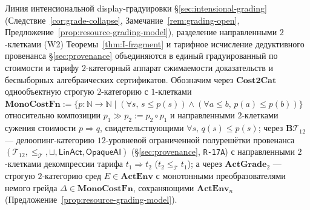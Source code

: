 \documentclass[11pt]{article}
\theoremstyle{plain}
\theoremstyle{definition}
\begin{document}
Линия интенсиональной display-градуировки \S\ref{sec:intensional-grading} (Следствие~\ref{cor:grade-collapse}, Замечание~\ref{rem:grading-open}, Предложение~\ref{prop:resource-grading-model}), разделение направленными $2$-клетками \textup{(W2)} Теоремы~\ref{thm:I-fragment} и тарифное исчисление дедуктивного провенанса \S\ref{sec:provenance} объединяются в единый градуированный по стоимости и тарифу $2$-категорный аппарат сжимаемости доказательств и бесвыборных алгебраических сертификатов. Обозначим через $\mathbf{Cost2Cat}$ однообъектную строгую $2$-категорию с $1$-клетками $\mathbf{MonoCostFn} := \{p : \mathbb{N} \to \mathbb{N} \mid (\forall s,\, s \le p(s)) \wedge (\forall a \le b,\, p(a) \le p(b))\}$ относительно композиции $p_1 \gg p_2 := p_2 \circ p_1$ и направленными $2$-клетками сужения стоимости $p \Rightarrow q$, свидетельствующими $\forall s,\, q(s) \le p(s)$; через $\mathbf{B}\mathcal{T}_{12}$ --- делоопинг-категорию $12$-уровневой ограниченной полурешётки провенанса $(\mathcal{T}_{12}, \le_{\mathcal{T}}, \sqcup, \mathsf{LinAct}, \mathsf{OpaqueAI})$ (\S\ref{sec:provenance}, \texttt{R-17A}) с направленными $2$-клетками декомпрессии тарифа $t_1 \Rightarrow t_2$ ($t_2 \le_{\mathcal{T}} t_1$); а через $\mathbf{ActGrade}_2$ --- строгую $2$-категорию сред $E \in \mathbf{ActEnv}$ с монотонными преобразователями немого грейда $\Delta \in \mathbf{MonoCostFn}$, сохраняющими $\mathbf{ActEnv}_n$ (Предложение~\ref{prop:resource-grading-model}).
\end{document}
